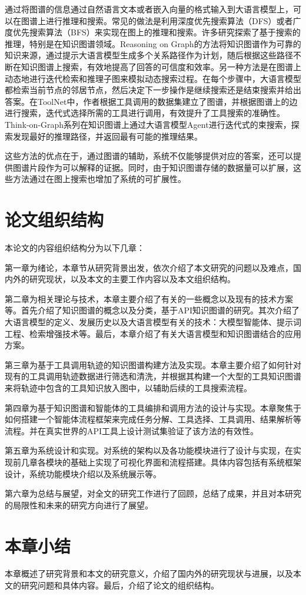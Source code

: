 通过将图谱的信息通过自然语言文本或者嵌入向量的格式输入到大语言模型上，可以在图谱上进行推理和搜索。常见的做法是利用深度优先搜索算法（DFS）或者广度优先搜索算法（BFS）来实现在图上的推理和搜索。许多研究探索了基于搜索的推理，特别是在知识图谱领域。Reasoning on Graph\cite{Luo2023}的方法将知识图谱作为可靠的知识来源，通过提示大语言模型生成多个关系路径作为计划，随后根据这些路径不断在知识图谱上搜索，有效地提高了回答的可信度和效率。另一种方法是在图谱上动态地进行迭代检索和推理子图来模拟动态搜索过程\cite{Liu2024, Sun2023, Ma2024}。在每个步骤中，大语言模型都检索当前节点的邻居节点，然后决定下一步操作是继续搜索还是结束搜索并给出答案。在ToolNet\cite{Liu2024}中，作者根据工具调用的数据集建立了图谱，并根据图谱上的边进行搜索，迭代式选择所需的工具进行调用，有效提升了工具搜索的准确性。Think-on-Graph系列\cite{Sun2023,Ma2024}在知识图谱上通过大语言模型Agent进行迭代式的束搜索，探索发现最好的推理路径，并返回最有可能的推理结果。

这些方法的优点在于，通过图谱的辅助，系统不仅能够提供对应的答案，还可以提供图谱片段作为可以解释的证据。同时，由于知识图谱存储的数据量可以扩展，这些方法通过在图上搜索也增加了系统的可扩展性。

\section{论文组织结构}

本论文的内容组织结构分为以下几章：

\indent 第一章为绪论，本章节从研究背景出发，依次介绍了本文研究的问题以及难点，国内外的研究现状，以及本文的主要工作内容以及本文组织结构。

\indent 第二章为相关理论与技术，本章主要介绍了有关的一些概念以及现有的技术方案等。首先介绍了知识图谱的概念以及分类，基于API知识图谱的研究。其次介绍了大语言模型的定义、发展历史以及大语言模型有关的技术：大模型智能体、提示词工程、检索增强技术等。最后，本章介绍了有关大语言模型和知识图谱结合的应用方案。

\indent 第三章为基于工具调用轨迹的知识图谱构建方法及实现。本章主要介绍了如何针对现有的工具调用轨迹数据进行筛选和清洗，并根据其构建一个大型的工具知识图谱来将轨迹中包含的工具知识放入图中，以辅助后续的工具搜索流程。

\indent 第四章为基于知识图谱和智能体的工具编排和调用方法的设计与实现。本章聚焦于如何搭建一个智能体流程框架来完成任务分解、工具选择、工具调用、结果解析等流程。并在真实世界的API工具上设计测试集验证了该方法的有效性。

\indent 第五章为系统设计和实现。对系统的架构以及各功能模块进行了设计与实现，在实现前几章各模块的基础上实现了可视化界面和流程搭建。具体内容包括有系统框架设计，系统功能模块介绍以及系统展示等。

\indent 第六章为总结与展望，对全文的研究工作进行了回顾，总结了成果，并且对本研究的局限性和未来的研究方向进行了展望。

\section{本章小结}
本章概述了研究背景和本文的研究意义，介绍了国内外的研究现状与进展，以及本文的研究问题和具体内容。最后，介绍了论文的组织结构。